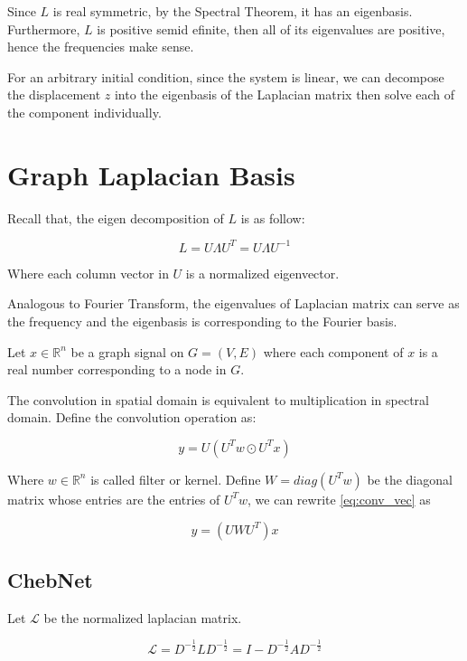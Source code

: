 \documentclass{article}
\begin{document}
Since $L$ is real symmetric, by the Spectral Theorem, it has an eigenbasis. Furthermore, $L$ is positive semid efinite, then all of its eigenvalues are positive, hence the frequencies make sense.

For an arbitrary initial condition, since the system is linear, we can decompose the displacement $z$ into the eigenbasis of the Laplacian matrix then solve each of the component individually.

\section{Graph Laplacian Basis}

Recall that, the eigen decomposition of $L$ is as follow:

\begin{equation}
    L = U \Lambda U^T = U \Lambda U^{-1}
\end{equation}

Where each column vector in $U$ is a normalized eigenvector.

Analogous to Fourier Transform, the eigenvalues of Laplacian matrix can serve as the frequency and the eigenbasis is corresponding to the Fourier basis.

Let $x \in \mathbb{R}^n$ be a graph signal on $G = (V, E)$ where each component of $x$ is a real number corresponding to a node in $G$.

The convolution in spatial domain is equivalent to multiplication in spectral domain. Define the convolution operation as:

\begin{equation}
    y =  U ( U^T w \odot U^T x )
    \label{eq:conv_vec}
\end{equation}

Where $w \in \mathbb{R}^n$ is called filter or kernel. Define $W = diag(U^T w)$ be the diagonal matrix whose entries are the entries of $U^T w$, we can rewrite \ref{eq:conv_vec} as

\begin{equation}
    y =  (U W U^T) x
\end{equation}

\subsection{ChebNet}


Let $\mathcal{L}$ be the normalized laplacian matrix.

\begin{equation}
    \mathcal{L} = D^{-\frac{1}{2}} L D^{-\frac{1}{2}} = I - D^{-\frac{1}{2}} A D^{-\frac{1}{2}}
\end{equation}
\end{document}
